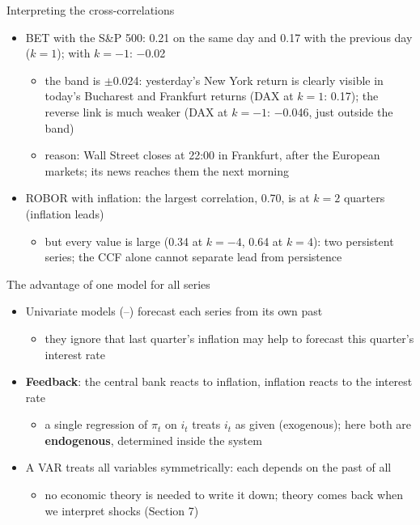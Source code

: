 \begin{frame}{Interpreting the cross-correlations}
\itemsize{\small}
\begin{itemize}
    \item BET with the S\&P 500: 0.21 on the same day and 0.17 with the previous day ($k = 1$); with $k = -1$: $-$0.02
    \begin{itemize}
        \item the band is $\pm$0.024: yesterday's New York return is clearly visible in today's Bucharest and Frankfurt returns (DAX at $k = 1$: 0.17); the reverse link is much weaker (DAX at $k = -1$: $-$0.046, just outside the band)
        \item reason: Wall Street closes at 22:00 in Frankfurt, after the European markets; its news reaches them the next morning
    \end{itemize}
    \item ROBOR with inflation: the largest correlation, 0.70, is at $k = 2$ quarters (inflation leads)
    \begin{itemize}
        \item but every value is large (0.34 at $k = -4$, 0.64 at $k = 4$): two persistent series; the CCF alone cannot separate lead from persistence
    \end{itemize}
\end{itemize}
\end{frame}

\begin{frame}{The advantage of one model for all series}
\itemsize{\small}
\begin{itemize}
    \item Univariate models (--) forecast each series from its own past
    \begin{itemize}
        \item they ignore that last quarter's inflation may help to forecast this quarter's interest rate
    \end{itemize}
    \item \textbf{Feedback}: the central bank reacts to inflation, inflation reacts to the interest rate
    \begin{itemize}
        \item a single regression of $\pi_t$ on $i_t$ treats $i_t$ as given (exogenous); here both are \textbf{endogenous}, determined inside the system
    \end{itemize}
    \item A VAR treats all variables symmetrically: each depends on the past of all
    \begin{itemize}
        \item no economic theory is needed to write it down; theory comes back when we interpret shocks (Section 7)
    \end{itemize}
\end{itemize}
\end{frame}

